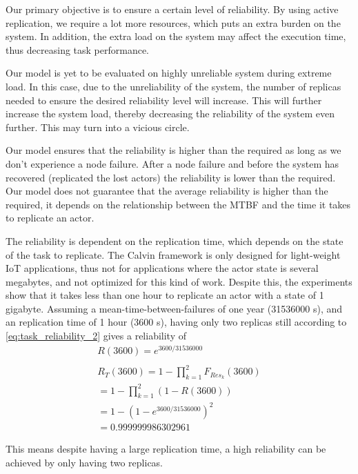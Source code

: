 \documentclass{cslthse-msc}
\begin{document}
Our primary objective is to ensure a certain level of reliability. By using active replication, we require a lot more resources, which puts an extra burden on the system. In addition, the extra load on the system may affect the execution time, thus decreasing task performance.

Our model is yet to be evaluated on highly unreliable system during extreme load. In this case, due to the unreliability of the system, the number of replicas needed to ensure the desired reliability level will increase. This will further increase the system load, thereby decreasing the reliability of the system even further. This may turn into a vicious circle.

Our model ensures that the reliability is higher than the required as long as we don't experience a node failure. After a node failure and before the system has recovered (replicated the lost actors) the reliability is lower than the required. Our model does not guarantee that the average reliability is higher than the required, it depends on the relationship between the MTBF and the time it takes to replicate an actor.

The reliability is dependent on the replication time, which depends on the state of the task to replicate. The Calvin framework is only designed for light-weight IoT applications, thus not for applications where the actor state is several megabytes, and not optimized for this kind of work. Despite this, the experiments show that it takes less than one hour to replicate an actor with a state of 1 gigabyte. Assuming a mean-time-between-failures of one year (31536000 s), and an replication time of 1 hour (3600 s), having only two replicas still according to \cref{eq:task_reliability_2} gives a reliability of
\begin{equation*}
\begin{split}
R(3600) = e^{3600/31536000}\\
\\
R_{T}(3600) = 1 - \prod\limits_{k=1}^2  F_{Res_k}(3600)\\
= 1 - \prod\limits_{k=1}^2  (1 - R(3600))\\
= 1 - (1 - e^{3600/31536000})^2\\
=  0.999999986302961
\end{split}
\end{equation*}

This means despite having a large replication time, a high reliability can be achieved by only having two replicas.
\end{document}
